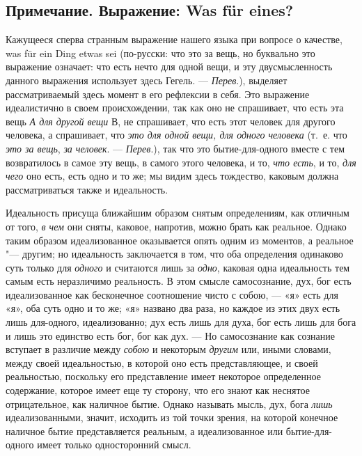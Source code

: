\subsection*{Примечание. Выражение: Was für eines?}

Кажущееся сперва странным выражение нашего языка при вопросе о качестве, was
für ein Ding etwas sei (по-русски: что это за вещь, но буквально это
выражение означает: что есть нечто для одной вещи, и эту двусмысленность
данного выражения использует здесь Гегель. — {\em Перев}.), выделяет
рассматриваемый здесь момент в его рефлексии в себя. Это выражение
идеалистично в своем происхождении, так как оно не спрашивает, что есть эта
вещь {\em А для другой вещи} В, не спрашивает, что есть
этот человек для другого человека, а спрашивает, что
{\em это для одной вещи, для одного человека} (т.~е.
что {\em это за вещь}, {\em за
человек}. — {\em Перев}.), так что это бытие-для-одного вместе с тем
возвратилось в самое эту вещь, в самого этого человека, и то,
{\em что есть}, и то, {\em для
чего} оно есть, есть одно и то же; мы видим здесь тождество, каковым должна
рассматриваться также и идеальность.

Идеальность присуща ближайшим образом снятым определениям, как отличным от
того, {\em в чем} они сняты, каковое, напротив, можно
брать как реальное. Однако таким образом идеализованное оказывается опять
одним из моментов, а реальное "--- другим; но идеальность заключается в том,
что оба определения одинаково суть только для
{\em одного} и считаются лишь за
{\em одно}, каковая одна идеальность тем самым есть
неразличимо реальность. В этом смысле самосознание, дух, бог есть
идеализованное как бесконечное соотношение чисто с собою, — «я» есть для
«я», оба суть одно и то же; «я» названо два раза, но каждое из этих двух
есть лишь для-одного, идеализованно; дух есть лишь для духа, бог есть лишь
для бога и лишь это единство есть бог, бог как дух. — Но самосознание как
сознание вступает в различие между {\em собою} и
некоторым {\em другим} или, иными словами, между своей
идеальностью, в которой оно есть представляющее, и своей реальностью,
поскольку его представление имеет некоторое определенное содержание,
которое имеет еще ту сторону, что его знают как неснятое отрицательное,
как наличное бытие. Однако называть мысль, дух, бога
{\em лишь} идеализованными, значит, исходить из той
точки зрения, на которой конечное наличное бытие представляется реальным, а
идеализованное или бытие-для-одного имеет только односторонний смысл.

